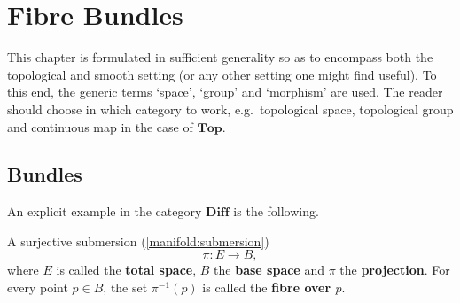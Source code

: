 \chapter{Fibre Bundles}\label{chapter:bundles}

    This chapter is formulated in sufficient generality so as to encompass both the topological and smooth setting (or any other setting one might find useful). To this end, the generic terms `space', `group' and `morphism' are used. The reader should choose in which category to work, e.g.~topological space, topological group and continuous map in the case of $\mathbf{Top}$.

\section{Bundles}


    An explicit example in the category $\mathbf{Diff}$ is the following.
    \begin{example}
        A surjective submersion (\cref{manifold:submersion}) \[\pi:E\rightarrow B,\] where $E$ is called the \textbf{total space}, $B$ the \textbf{base space} and $\pi$ the \textbf{projection}. For every point $p\in B$, the set $\pi^{-1}(p)$ is called the \textbf{fibre over $p$}.
    \end{example}

